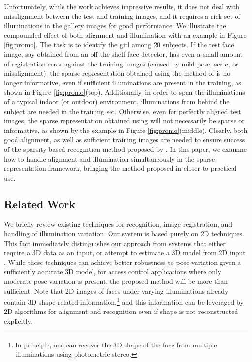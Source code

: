 \documentclass[10pt,journal,letterpaper,compsoc]{IEEEtran}
\begin{document}
Unfortunately, while the work \cite{Wright2009-PAMI} achieves impressive results, it does not deal with misalignment
between the test and training images, and it requires a rich set of illuminations
in the gallery images for good performance.
We illustrate the compounded effect of both alignment and illumination
with an example in Figure \ref{fig:promo}.
The task is to identify the girl among 20 subjects. If the test
face image, say obtained from an off-the-shelf face detector,
has even a small amount of registration error against the
training images (caused by mild pose, scale, or misalignment),
the sparse representation obtained using the method of \cite{Wright2009-PAMI} is no longer informative,
even if sufficient illuminations are present in the training, as shown in Figure
\ref{fig:promo}(top). Additionally, in order to span
the illuminations of a typical indoor (or outdoor) environment,
illuminations from behind the subject are needed in the
training set. Otherwise, even for perfectly aligned test images,
the sparse representation obtained using \cite{Wright2009-PAMI} will not necessarily be sparse or
informative, as shown by the example in Figure
\ref{fig:promo}(middle). Clearly, both good alignment, as well
as sufficient training images are needed to ensure success of the sparsity-based
recognition method proposed by \cite{Wright2009-PAMI}.
In this paper, we examine how to handle alignment and illumination simultaneously
in the sparse representation framework, bringing the method proposed in \cite{Wright2009-PAMI}
closer to practical use.

\vspace{-0mm}
\subsection{Related Work}
We briefly review existing techniques for recognition, image
registration, and handling of illumination variation.  Our
system is based purely on 2D techniques.  This fact immediately
distinguishes our approach from systems that either require a
3D data as an input, or attempt to estimate a 3D model from 2D
input \cite{amberg2007reconstructing,Blanz2003-PAMI}.  While
these techniques can achieve better robustness to pose
variation given a sufficiently accurate 3D model, for access
control applications where only moderate pose variation is
present, the proposed method will be more than sufficient.
Note that 2D images of faces under varying illuminations
already contain 3D shape-related information,\footnote{In
principle, one can recover the 3D shape of the face from
multiple illuminations using photometric stereo.} and this
information can be leveraged by 2D algorithms for alignment and
recognition even if shape is not reconstructed explicitly.
\end{document}
